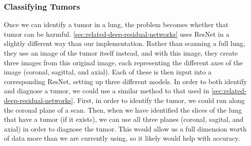 \documentclass[10pt,twocolumn,letterpaper]{article}
\begin{document}
      \subsubsection{Classifying Tumors} \label{sec:classify-tumor}

         Once we can identify a tumor in a lung, the problem becomes whether that tumor can be harmful. \ref{sec:related-deep-residual-networks} uses ResNet in a slightly different way than our implementation. Rather than scanning a full lung, they use an image of the tumor itself instead, and with this image, they create three images from this original image, each representing the different axes of the image (coronal, sagittal, and axial). Each of these is then input into a corresponding ResNet, setting up three different models. In order to both identify and diagnose a tumor, we could use a similar method to that used in \ref{sec:related-deep-residual-networks}. First, in order to identify the tumor, we could run along the coronal plane of a scan. Then, when we have identified the slices of the lung that have a tumor (if it exists), we can use all three planes (coronal, sagital, and axial) in order to diagnose the tumor. This would allow us a full dimension worth of data more than we are currently using, so it likely would help with accuracy. 

{\small



}
\end{document}
